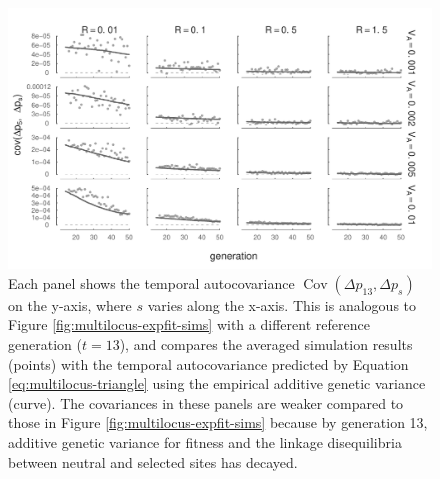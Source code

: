 \documentclass[11pt]{article}
\DeclareMathOperator{\cov}{Cov}
\begin{document}
\begin{figure}[!ht]
  \centering
  \includegraphics{./images/sim-pred13-covs-varyl.pdf}
  \caption{Each panel shows the temporal autocovariance $\cov(\Delta p_{13},
    \Delta p_s)$ on the y-axis, where $s$ varies along the x-axis. This is
    analogous to Figure \ref{fig:multilocus-expfit-sims} with a different
    reference generation ($t=13$), and compares the averaged simulation results
    (points) with the temporal autocovariance predicted by Equation
    \eqref{eq:multilocus-triangle} using the empirical additive genetic
    variance (curve). The covariances in these panels are weaker compared
    to those in Figure \ref{fig:multilocus-expfit-sims} because by generation
    13, additive genetic variance for fitness and the linkage disequilibria
    between neutral and selected sites has decayed.
}

\label{fig:multilocus-expfit-sims-gen13} 
\end{figure}
\end{document}
